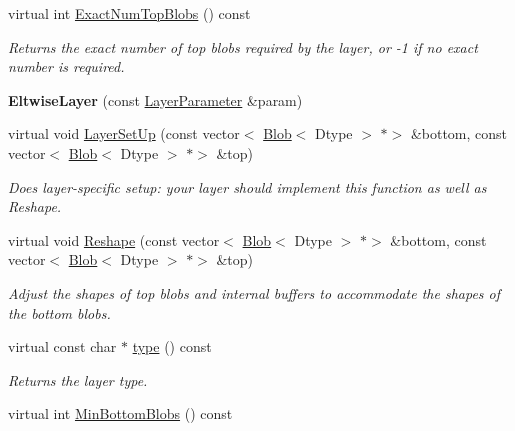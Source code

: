 \begin{DoxyCompactItemize}
virtual int \mbox{\hyperlink{classcaffe_1_1_eltwise_layer_a60ae4a38cade1cc7f6111e51cabb441b}{Exact\+Num\+Top\+Blobs}} () const
\begin{DoxyCompactList}\small\item\em Returns the exact number of top blobs required by the layer, or -\/1 if no exact number is required. \end{DoxyCompactList}\item 
\mbox{\label{classcaffe_1_1_eltwise_layer_a896ae6914a6358a90e3e67621a6fe082}} 
{\bfseries Eltwise\+Layer} (const \mbox{\hyperlink{classcaffe_1_1_layer_parameter}{Layer\+Parameter}} \&param)
\item 
virtual void \mbox{\hyperlink{classcaffe_1_1_eltwise_layer_a31bdf9cf9a45105610a85cd82a96e0bf}{Layer\+Set\+Up}} (const vector$<$ \mbox{\hyperlink{classcaffe_1_1_blob}{Blob}}$<$ Dtype $>$ $\ast$$>$ \&bottom, const vector$<$ \mbox{\hyperlink{classcaffe_1_1_blob}{Blob}}$<$ Dtype $>$ $\ast$$>$ \&top)
\begin{DoxyCompactList}\small\item\em Does layer-\/specific setup\+: your layer should implement this function as well as Reshape. \end{DoxyCompactList}\item 
virtual void \mbox{\hyperlink{classcaffe_1_1_eltwise_layer_a3f9e26946868f6249af1d4f57fc8259f}{Reshape}} (const vector$<$ \mbox{\hyperlink{classcaffe_1_1_blob}{Blob}}$<$ Dtype $>$ $\ast$$>$ \&bottom, const vector$<$ \mbox{\hyperlink{classcaffe_1_1_blob}{Blob}}$<$ Dtype $>$ $\ast$$>$ \&top)
\begin{DoxyCompactList}\small\item\em Adjust the shapes of top blobs and internal buffers to accommodate the shapes of the bottom blobs. \end{DoxyCompactList}\item 
\mbox{\label{classcaffe_1_1_eltwise_layer_a2942edf636e0a740d718781325912693}} 
virtual const char $\ast$ \mbox{\hyperlink{classcaffe_1_1_eltwise_layer_a2942edf636e0a740d718781325912693}{type}} () const
\begin{DoxyCompactList}\small\item\em Returns the layer type. \end{DoxyCompactList}\item 
virtual int \mbox{\hyperlink{classcaffe_1_1_eltwise_layer_a802079d89e0f007c15b39e0c1fb0d275}{Min\+Bottom\+Blobs}} () const

\end{DoxyCompactItemize}
